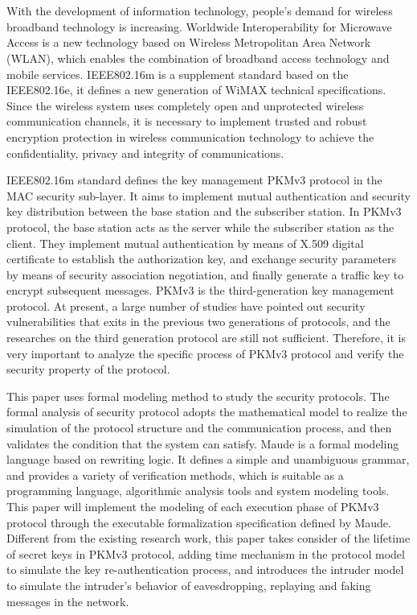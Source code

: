 \newpage
\vspace{-1cm}
\chapter*{}
\vspace{-0.5cm}
With the development of information technology, people's demand for wireless broadband technology is increasing. Worldwide Interoperability for Microwave Access is a new technology based on Wireless Metropolitan Area Network (WLAN), which enables the combination of broadband access technology and mobile services. IEEE802.16m is a supplement standard based on the IEEE802.16e, it defines a new generation of WiMAX technical specifications. Since the wireless system uses completely open and unprotected wireless communication channels, it is necessary to implement trusted and robust encryption protection in wireless communication technology to achieve the confidentiality, privacy and integrity of communications.

IEEE802.16m standard defines the key management PKMv3 protocol in the MAC security sub-layer. It aims to implement mutual authentication and security key distribution between the base station and the subscriber station. In PKMv3 protocol, the base station acts as the server while the subscriber station as the client. They implement mutual authentication by means of X.509 digital certificate to establish the authorization key, and exchange security parameters by means of security association negotiation, and finally generate a traffic key to encrypt subsequent messages. PKMv3 is the third-generation key management protocol. At present, a large number of studies have pointed out security vulnerabilities that exits in the previous two generations of protocols, and the researches on the third generation protocol are still not sufficient. Therefore, it is very important to analyze the specific process of PKMv3 protocol and verify the security property of the protocol.

This paper uses formal modeling method to study the security protocols. The formal analysis of security protocol adopts the mathematical model to realize the simulation of the protocol structure and the communication process, and then validates the condition that the system can satisfy. Maude is a formal modeling language based on rewriting logic. It defines a simple and unambiguous grammar,  and provides a variety of verification methods, which is suitable as a programming language, algorithmic analysis tools and system modeling tools. This paper will implement the modeling of each execution phase of PKMv3 protocol through the executable formalization specification defined by Maude. Different from the existing research work, this paper takes consider of the lifetime of secret keys in PKMv3 protocol, adding time mechanism in the protocol model to simulate the key re-authentication process, and introduces the intruder model to simulate the intruder's behavior of  eavesdropping, replaying and faking messages in the network.

